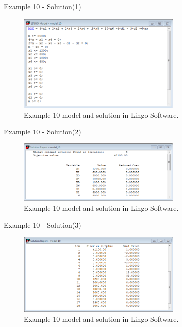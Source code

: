 \begin{frame}{Example 10 - Solution(1)}
\begin{figure}
    \includegraphics[width=300px]{slides/ex10/screenshot_a.png}
    \caption{Example 10 model and solution in Lingo Software.}
\end{figure}
\end{frame}

\begin{frame}{Example 10 - Solution(2)}
\begin{figure}
    \includegraphics[width=300px]{slides/ex10/screenshot_b.png}
    \caption{Example 10 model and solution in Lingo Software.}
\end{figure}
\end{frame}

\begin{frame}{Example 10 - Solution(3)}
\begin{figure}
    \includegraphics[width=300px]{slides/ex10/screenshot_c.png}
    \caption{Example 10 model and solution in Lingo Software.}
\end{figure}
\end{frame}
